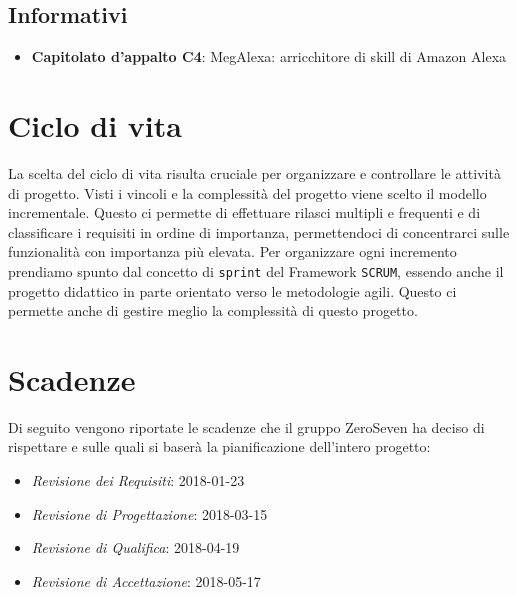 \subsection{Informativi}
\begin{itemize}
	\item \textbf{Capitolato d'appalto C4}: MegAlexa: arricchitore di skill di Amazon Alexa
\end{itemize}
\section{Ciclo di vita}
La scelta del ciclo di vita risulta cruciale per organizzare e controllare le attività di progetto. Visti i vincoli e la complessità del progetto viene scelto il modello incrementale. Questo ci permette di effettuare rilasci multipli e frequenti e di classificare i requisiti in ordine di importanza, permettendoci di concentrarci sulle funzionalità con importanza più elevata. Per organizzare ogni incremento prendiamo spunto dal concetto di \texttt{sprint} del Framework \texttt{SCRUM}, essendo anche il progetto didattico in parte orientato verso le metodologie agili. Questo ci permette anche di gestire meglio la complessità di questo progetto.
\section{Scadenze}
Di seguito vengono riportate le scadenze che il gruppo ZeroSeven ha deciso di rispettare e sulle quali si baserà la pianificazione dell'intero progetto:
\begin{itemize}
	\item \textit{Revisione dei Requisiti}: 2018-01-23
	\item \textit{Revisione di Progettazione}: 2018-03-15
	\item \textit{Revisione di Qualifica}: 2018-04-19
	\item \textit{Revisione di Accettazione}: 2018-05-17
\end{itemize}